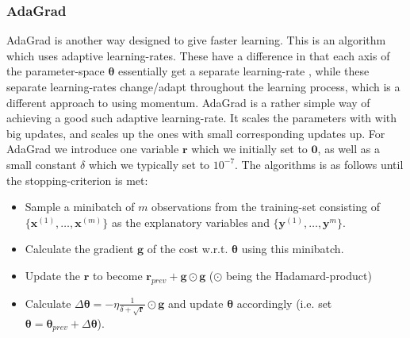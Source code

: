 \documentclass{article}
\begin{document}
\subsubsection{AdaGrad}
AdaGrad is another way designed to give faster learning. This is an algorithm
which uses adaptive learning-rates. These have a difference in that each axis of
the parameter-space $\bm{\theta}$ essentially get a separate learning-rate
\cite[s.~8.5]{goodfellow2016deep}, while these separate learning-rates change/adapt
throughout the learning process, which is a different approach to using momentum.
AdaGrad is a rather simple way of achieving a good such adaptive learning-rate.
It scales the parameters with with big updates, and scales up the ones with
small corresponding updates up. For AdaGrad we introduce one variable $\bm{r}$
which we initially set to $\bm{0}$, as well as a small constant $\delta$ which
we typically set to $10^{-7}$. The algorithms is as follows until the
stopping-criterion is met:
\begin{itemize}
    \item Sample a minibatch of $m$ observations from the training-set
          consisting of $\{\bm{x}^{(1)}, \dots, \bm{x}^{(m)}\}$ as the explanatory
          variables and $\{\bm{y}^{(1)}, \dots, \bm{y}^{m}\}$.
    \item Calculate the gradient $\bm{g}$ of the cost w.r.t. $\bm{\theta}$ using
          this minibatch.
    \item Update the $\bm{r}$ to become $\bm{r}_{prev} + \bm{g} \odot \bm{g}$
          ($\odot$ being the Hadamard-product)
    \item Calculate $\Delta \bm{\theta} = -\eta
              \frac{1}{\delta + \sqrt{\bm{r}}} \odot \bm{g}$ and update
          $\bm{\theta}$ accordingly (i.e. set $\bm{\theta} =
              \bm{\theta}_{prev} + \Delta \bm{\theta}$).

\end{itemize}
\end{document}
